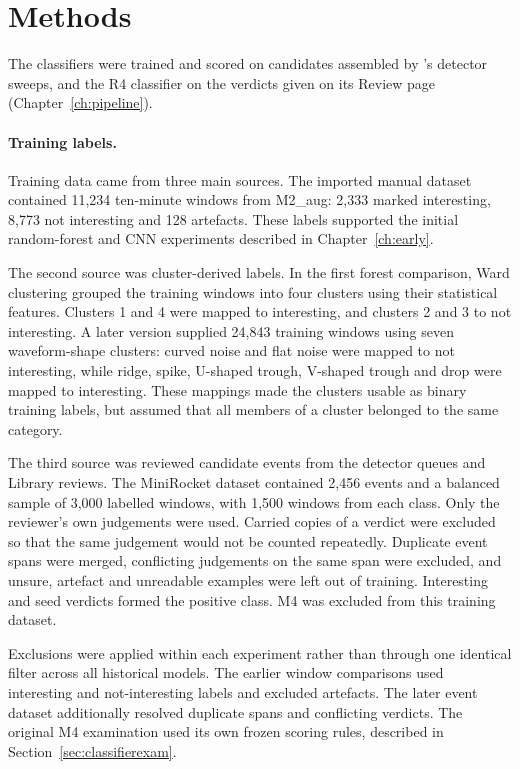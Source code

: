 \section{Methods}

The classifiers were trained and scored on candidates assembled by \tool{}'s detector sweeps, and the R4 classifier on the verdicts given on its Review page (Chapter~\ref{ch:pipeline}).

\paragraph{Training labels.}
Training data came from three main sources. The imported manual dataset contained 11,234 ten-minute windows from M2\_aug: 2,333 marked interesting, 8,773 not interesting and 128 artefacts. These labels supported the initial random-forest and CNN experiments described in Chapter~\ref{ch:early}.

The second source was cluster-derived labels. In the first forest comparison, Ward clustering grouped the training windows into four clusters using their statistical features. Clusters 1 and 4 were mapped to interesting, and clusters 2 and 3 to not interesting. A later version supplied 24,843 training windows using seven waveform-shape clusters: curved noise and flat noise were mapped to not interesting, while ridge, spike, U-shaped trough, V-shaped trough and drop were mapped to interesting. These mappings made the clusters usable as binary training labels, but assumed that all members of a cluster belonged to the same category.

The third source was reviewed candidate events from the detector queues and Library reviews. The MiniRocket dataset contained 2,456 events and a balanced sample of 3,000 labelled windows, with 1,500 windows from each class. Only the reviewer's own judgements were used. Carried copies of a verdict were excluded so that the same judgement would not be counted repeatedly. Duplicate event spans were merged, conflicting judgements on the same span were excluded, and unsure, artefact and unreadable examples were left out of training. Interesting and seed verdicts formed the positive class. M4 was excluded from this training dataset.

Exclusions were applied within each experiment rather than through one identical filter across all historical models. The earlier window comparisons used interesting and not-interesting labels and excluded artefacts. The later event dataset additionally resolved duplicate spans and conflicting verdicts. The original M4 examination used its own frozen scoring rules, described in Section~\ref{sec:classifierexam}.

